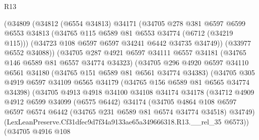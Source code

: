\begin{lexlean}{R13}
\begin{coremodule}
                    (@34809
                      (@34812
                        (@6554 @34813)
                        @34171
                        (@34705
                          @278
                          @381
                          @6597
                          @6599
                          @6553
                          @34813
                          (@34765 @115 @6589 @81 @6553 @34774 (@6712 (@34219 @115)))
                          (@34723 @108 @6597 @6597 @34241 @6442 @34735 @34749))
                        (@33977 @6552 @34088))
                      (@34705
                        @287
                        @4921
                        @6597
                        @34111
                        @6557
                        @34181
                        (@34765 @146 @6589 @81 @6557 @34774 @34323)
                        (@34705
                          @296
                          @4920
                          @6597
                          @34110
                          @6561
                          @34180
                          (@34765 @151 @6589 @81 @6561 @34774 @34383)
                          (@34705
                            @305
                            @4919
                            @6597
                            @34109
                            @6565
                            @34179
                            (@34765 @156 @6589 @81 @6565 @34774 @34398)
                            (@34705
                              @4913
                              @4918
                              @34100
                              @34108
                              @34174
                              @34178
                              (@34712
                                @4909
                                @4912
                                @6599
                                @34099
                                (@6575 @6442)
                                @34174
                                (@34705
                                  @4864
                                  @108
                                  @6597
                                  @6597
                                  @6574
                                  @6442
                                  (@34765 @231 @6589 @81 @6574 @34774 @34518)
                                  @34749)
                                (LexLeanPreserve.Cf31dfec9d7f34a9133ae65a349666318.R13.__rel_35
                                  @6573))
                              (@34705
                                @4916
                                @108

\end{coremodule}
\end{lexlean}
